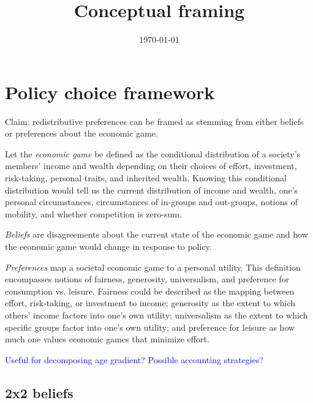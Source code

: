 \documentclass{article}
\title{Conceptual framing}
\date{\today}
\newcommand{\blue}[1]{\textcolor{blue}{#1}}
\begin{document}
\maketitle



\section*{Policy choice framework}

Claim: redistributive preferences can be framed as stemming from either beliefs or preferences about the economic game.

Let the \textit{economic game} be defined as the conditional distribution of a society's members' income and wealth depending on their choices of effort, investment, risk-taking, personal traits, and inherited wealth. Knowing this conditional distribution would tell us the current distribution of income and wealth, one's personal circumstances, circumstances of in-groups and out-groups, notions of mobility, and whether competition is zero-sum.

\textit{Beliefs} are disagreements about the current state of the economic game and how the economic game would change in response to policy. 

\textit{Preferences} map a societal economic game to a personal utility. This definition encompasses notions of fairness, generosity, universalism, and preference for consumption vs. leisure. Fairness could be described as the mapping between effort, risk-taking, or investment to income; generosity as the extent to which others' income factors into one's own utility; universalism as the extent to which specific groups factor into one's own utility; and preference for leisure as how much one values economic games that minimize effort. 

\blue{Useful for decomposing age gradient? Possible accounting strategies? }

\subsection*{2x2 beliefs}
\end{document}
